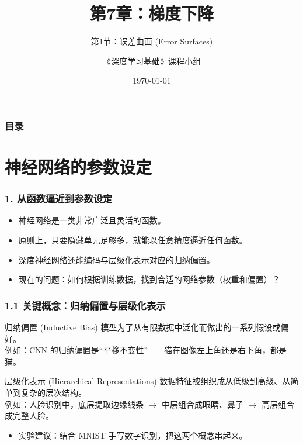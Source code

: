 \documentclass[t,aspectratio=169]{beamer} %
\title[7.1.误差曲面]{第7章：梯度下降}
\subtitle{第1节：误差曲面 (Error Surfaces)}
\author{《深度学习基础》课程小组}
\date{\today}
\begin{document}
\frame{\titlepage}

\begin{frame}
    \frametitle{目录}
    \tableofcontents
\end{frame}

\section{神经网络的参数设定}

\begin{frame}
    \frametitle{1. 从函数逼近到参数设定}
    \begin{itemize}
        \item 神经网络是一类\alert{非常广泛且灵活}的函数。
        \item 原则上，只要隐藏单元足够多，就能以任意精度逼近任何函数。
        \item 深度神经网络还能编码与\alert{层级化表示}对应的归纳偏置。
        \item 现在的问题：\alert{如何根据训练数据，找到合适的网络参数（权重和偏置）？}
    \end{itemize}
\end{frame}

\begin{frame}
    \frametitle{1.1 关键概念：归纳偏置与层级化表示}
    \begin{block}{归纳偏置 (Inductive Bias)}
        模型为了从有限数据中泛化而做出的一系列假设或偏好。\\
        例如：CNN 的归纳偏置是“平移不变性”——猫在图像左上角还是右下角，都是猫。
    \end{block}
    \begin{block}{层级化表示 (Hierarchical Representations)}
        数据特征被组织成从低级到高级、从简单到复杂的层次结构。\\
        例如：人脸识别中，底层提取边缘线条 $\rightarrow$ 中层组合成眼睛、鼻子 $\rightarrow$ 高层组合成完整人脸。
    \end{block}
    \begin{itemize}
        \item \alert{实验建议}：结合 MNIST 手写数字识别，把这两个概念串起来。
    \end{itemize}
\end{frame}

\end{document}
